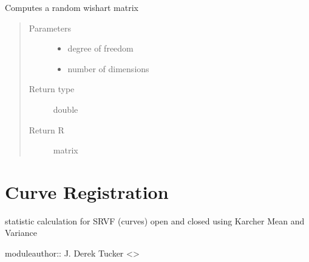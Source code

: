 \documentclass[letterpaper,10pt,english]{sphinxmanual}
\begin{document}

\begin{fulllineitems}
\label{\detokenize{tolerance:tolerance.rwishart}}
Computes a random wishart matrix
\begin{quote}\begin{description}
\item[{Parameters}] \leavevmode\begin{itemize}
\item {} 
 \textendash{} degree of freedom

\item {} 
 \textendash{} number of dimensions

\end{itemize}

\item[{Return type}] \leavevmode
double

\item[{Return R}] \leavevmode
matrix

\end{description}\end{quote}

\end{fulllineitems}



\chapter{Curve Registration}
\label{\detokenize{curve_statistics:curve-registration}}\label{\detokenize{curve_statistics::doc}}\label{\detokenize{curve_statistics:module-curve_stats}}
statistic calculation for SRVF (curves) open and closed using Karcher
Mean and Variance

moduleauthor:: J. Derek Tucker \textless{}\textgreater{}
\end{document}
